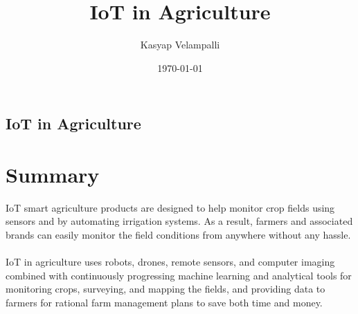\documentclass{report}
\title{IoT in Agriculture}
\author{Kasyap Velampalli}
\date{\today}
\begin{document}
    
    
    \begin{center}
        \section*{IoT in Agriculture}
    \end{center}
\setlength{\columnsep}{1.0cm}
    \large
    \section{Summary}
    IoT smart agriculture products are designed to help monitor crop fields using sensors
and by automating irrigation systems. As a result, farmers and associated brands
can easily monitor the field conditions from anywhere without any hassle.\\
    
    \\
    
   IoT in agriculture uses robots, drones, remote sensors, and computer imaging combined with continuously progressing machine learning and analytical tools for monitoring crops, surveying, and mapping the fields, and providing data to farmers for rational farm management plans to save both time and money.
\end{document}
